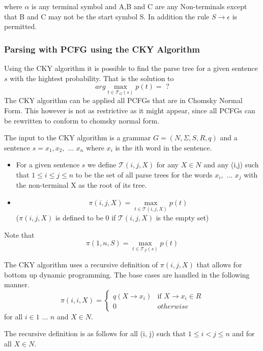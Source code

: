 where $\alpha$ is any terminal symbol and A,B and C are any Non-terminals except that B and C may not be the start symbol S.
In addition the rule $S \rightarrow \epsilon$ is permitted.
\cite[p.109]{sipser}

\subsubsection{Parsing with PCFG using the CKY Algorithm}

Using the CKY algorithm it is possible to find the parse tree for a given sentence $s$ with the hightest probability.
That is the solution to 
$$arg \max_{t \in \mathcal{T}_G(s)} p(t) = \text{ ?}$$
The CKY algorithm can be applied all PCFGs that are in Chomsky Normal Form.
This however is not as restrictive as it might appear, since all PCFGs can be rewritten to
conform to chomsky normal form.
\cite[p.10]{collins}

The input to the CKY algorithm is a grammar $G = (N, \Sigma, S, R, q)$ and a sentence $s = x_1, x_2, \text{ ... } x_n$
where $x_i$ is the ith word in the sentence.

\begin{itemize}
\item For a given sentence $s$ we define $\mathcal{T}(i,j,X)$ for any $X \in N$ and any (i,j) such that $1 \leq i \leq j \leq n$
to be the set of all parse trees for the words $x_i, \text{ ... } x_j$ with the non-terminal X as the root of its tree.

\item $$\pi(i,j,X) = \max_{t \in \mathcal{T}(i,j,X)}p(t)$$
($\pi(i,j,X)$ is defined to be 0 if $\mathcal{T}(i,j,X)$ is the empty set)
\end{itemize}

Note that 
$$\pi(1,n,S) = \max_{t \in \mathcal{T_G}(s)} p(t)$$

The CKY algorithm uses a recursive definition of $\pi(i,j,X)$ that allows for bottom up dynamic programming.
The base cases are handled in the following manner.
$$ 
\pi(i,i,X) = \begin{cases}
q(X \rightarrow x_i)   &\text{if } X \rightarrow x_i \in R \\
0                      &{otherwise}
\end{cases}
$$
for all $i \in 1 \text{ ... } n$ and $X \in N$. 
\cite[p.12]{collins}

The recursive definition is as follows for all (i, j) such that $1 \leq i < j \leq n$ and for all $X \in N$.

